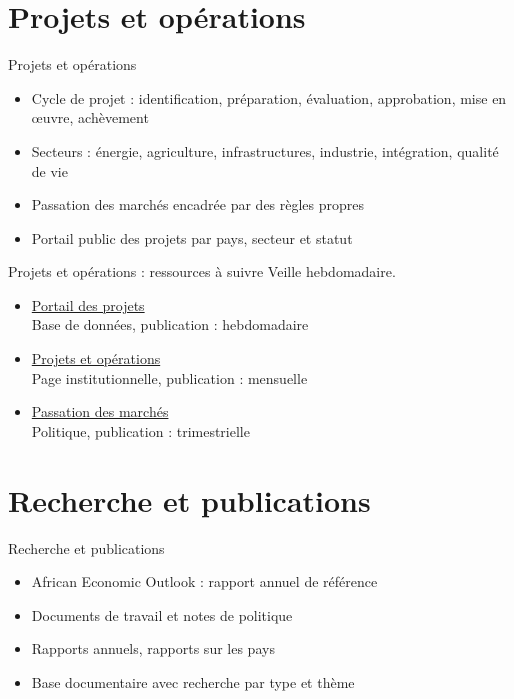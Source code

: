 \documentclass[aspectratio=169,11pt]{beamer}
\begin{document}
\section{Projets et opérations}
\begin{frame}{Projets et opérations}
\begin{itemize}
\item Cycle de projet : identification, préparation, évaluation, approbation, mise en œuvre, achèvement
\item Secteurs : énergie, agriculture, infrastructures, industrie, intégration, qualité de vie
\item Passation des marchés encadrée par des règles propres
\item Portail public des projets par pays, secteur et statut
\end{itemize}
\end{frame}

\begin{frame}{Projets et opérations : ressources à suivre}
\small
Veille hebdomadaire.
\begin{itemize}
\item \href{https://projectsportal.afdb.org}{Portail des projets}\\{\footnotesize Base de données, publication : hebdomadaire}
\item \href{https://www.afdb.org/en/projects-and-operations}{Projets et opérations}\\{\footnotesize Page institutionnelle, publication : mensuelle}
\item \href{https://www.afdb.org/en/projects-and-operations/procurement}{Passation des marchés}\\{\footnotesize Politique, publication : trimestrielle}
\end{itemize}
\end{frame}

\section{Recherche et publications}
\begin{frame}{Recherche et publications}
\begin{itemize}
\item African Economic Outlook : rapport annuel de référence
\item Documents de travail et notes de politique
\item Rapports annuels, rapports sur les pays
\item Base documentaire avec recherche par type et thème
\end{itemize}
\end{frame}
\end{document}
